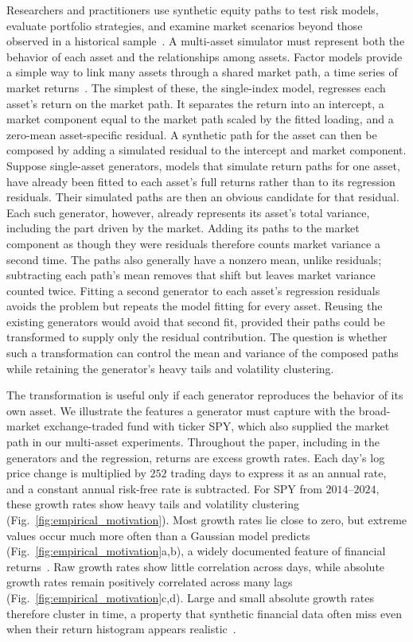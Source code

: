 Researchers and practitioners use synthetic equity paths to test risk
models, evaluate portfolio strategies, and examine market scenarios
beyond those observed in a historical sample~\cite{assefaEtAl2020,
jordonEtAl2022}. A multi-asset simulator must represent both the
behavior of each asset and the relationships among assets. Factor
models provide a simple way to link many assets through a shared
market path, a time series of market returns~\cite{sharpe1963,
rossAPT1976, famaFrench1993}. The simplest of these, the single-index
model, regresses each asset's return on the market path. It separates
the return into an intercept, a market component equal to the market
path scaled by the fitted loading, and a zero-mean asset-specific
residual. A synthetic path for the asset can then be composed by
adding a simulated residual to the intercept and market component.
Suppose single-asset generators, models that simulate return paths
for one asset, have already been fitted to each asset's full returns
rather than to its regression residuals. Their simulated paths are then
an obvious candidate for that residual. Each such generator, however, already represents
its asset's total variance, including the part driven by the market. Adding its paths to the market component as
though they were residuals therefore counts market variance a second
time. The paths also generally have a nonzero mean, unlike residuals;
subtracting each path's mean removes that shift but leaves market
variance counted twice. Fitting a second generator to each asset's
regression residuals avoids the problem but repeats the model fitting for every asset. Reusing the existing generators would
avoid that second fit, provided their paths could be transformed to
supply only the residual contribution. The question is whether such a
transformation can control the mean and variance of the composed paths
while retaining the generator's heavy tails and volatility clustering.

The transformation is useful only if each generator reproduces the
behavior of its own asset. We illustrate the features a generator must
capture with the broad-market exchange-traded fund with ticker SPY,
which also supplied the market path in our multi-asset experiments.
Throughout the paper, including in the generators and the
regression, returns are excess growth rates. Each day's log price
change is multiplied by $252$ trading days to express it as an annual
rate, and a constant annual risk-free rate is subtracted. For SPY from $2014$--$2024$, these growth rates show heavy
tails and volatility clustering (Fig.~\ref{fig:empirical_motivation}).
Most growth rates lie close to zero, but extreme values occur much more
often than a Gaussian model predicts
(Fig.~\ref{fig:empirical_motivation}a,b), a widely documented feature
of financial returns~\cite{mandelbrot1963, cont2001}. Raw growth rates
show little correlation across days, while absolute growth rates remain
positively correlated across many lags
(Fig.~\ref{fig:empirical_motivation}c,d). Large and small absolute
growth rates therefore cluster in time, a property that synthetic
financial data often miss even when their return histogram appears
realistic~\cite{stengerEtAl2024}.


